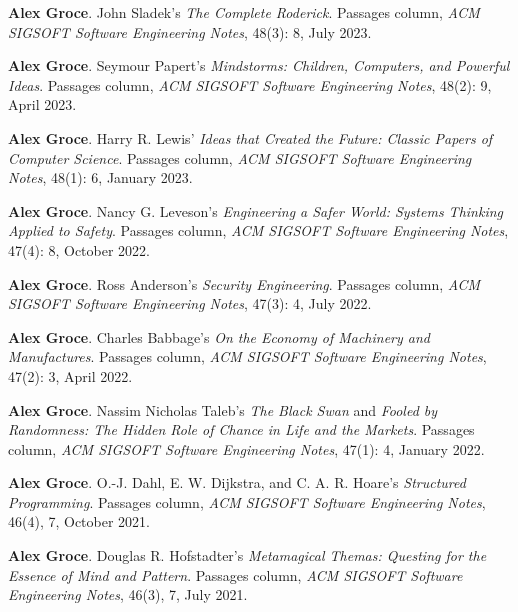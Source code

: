 \documentclass[ComputerScience]{vita}
\begin{document}
\begin{vita}
\begin{Columns, Book Reviews, and Magazine Articles}
\item {\bf Alex Groce}.
  \newblock John Sladek's \emph{The Complete Roderick}.
  \newblock Passages column, \emph{ACM SIGSOFT Software Engineering 
  Notes}, 48(3): 8, July 2023.

\item {\bf Alex Groce}. 
\newblock Seymour Papert's \emph{Mindstorms: Children, Computers, and Powerful Ideas}.
\newblock Passages column, \emph{ACM SIGSOFT Software Engineering 
  Notes}, 48(2): 9, April 2023.
  
\item {\bf Alex Groce}. 
\newblock Harry R. Lewis' \emph{Ideas that Created the Future: Classic Papers of Computer Science}.
\newblock Passages column, \emph{ACM SIGSOFT Software Engineering 
  Notes}, 48(1): 6, January 2023.
  
\item {\bf Alex Groce}. 
\newblock Nancy G. Leveson's \emph{Engineering a Safer World: Systems Thinking Applied to Safety}. 
\newblock Passages column, \emph{ACM SIGSOFT Software Engineering 
  Notes}, 47(4): 8, October 2022.
  
\item {\bf Alex Groce}. 
\newblock Ross Anderson's \emph{Security Engineering}. 
\newblock Passages column, \emph{ACM SIGSOFT Software Engineering 
  Notes}, 47(3): 4, July 2022.
  
\item {\bf Alex Groce}. 
\newblock Charles Babbage's \emph{On the Economy of Machinery and Manufactures}. 
\newblock Passages column, \emph{ACM SIGSOFT Software Engineering 
  Notes}, 47(2): 3, April 2022.
  
\item {\bf Alex Groce}. 
\newblock Nassim Nicholas Taleb’s \emph{The Black Swan} and \emph{Fooled by Randomness: The Hidden Role of Chance in Life and the Markets}. 
\newblock Passages column, \emph{ACM SIGSOFT Software Engineering 
  Notes}, 47(1): 4, January 2022.

\item {\bf Alex Groce}. 
\newblock O.-J. Dahl, E. W. Dijkstra, and C. A. R. Hoare’s \emph{Structured Programming}.
\newblock Passages column, \emph{ACM SIGSOFT Software Engineering 
  Notes}, 46(4), 7, October 2021.

\item {\bf Alex Groce}. 
\newblock Douglas R. Hofstadter's \emph{Metamagical Themas: Questing for the Essence of Mind and Pattern}. 
\newblock Passages column, \emph{ACM SIGSOFT Software Engineering 
  Notes}, 46(3), 7, July 2021.
  

\end{Columns, Book Reviews, and Magazine Articles}
\end{vita}
\end{document}
